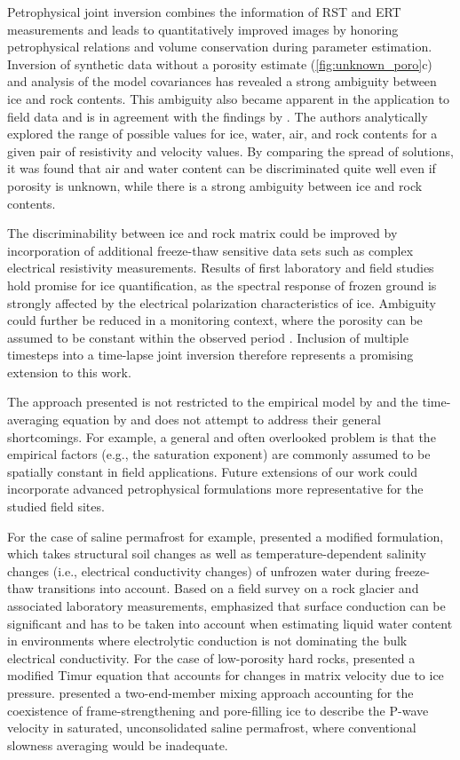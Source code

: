 \documentclass[extra]{gji}
\begin{document}
Petrophysical joint inversion combines the information of RST and ERT measurements and leads to quantitatively improved images by honoring petrophysical relations and volume conservation during parameter estimation.
Inversion of synthetic data without a porosity estimate (\autoref{fig:unknown_poro}c) and analysis of the model covariances has revealed a strong ambiguity between ice and rock contents.
This ambiguity also became apparent in the application to field data and is in agreement with the findings by \cite{Hauck2011}.
The authors analytically explored the range of possible values for ice, water, air, and rock contents for a given pair of resistivity and velocity values.
By comparing the spread of solutions, it was found that air and water content can be discriminated quite well even if porosity is unknown, while there is a strong ambiguity between ice and rock contents.

The discriminability between ice and rock matrix could be improved by incorporation of additional freeze-thaw sensitive data sets such as complex electrical resistivity measurements.
Results of first laboratory \citep{Wu2013, Kemna2014} and field studies \citep{Grimm2015, Mudler2019} hold promise for ice quantification, as the spectral response of frozen ground is strongly affected by the electrical polarization characteristics of ice.
Ambiguity could further be reduced in a monitoring context, where the porosity can be assumed to be constant within the observed period \citep{Hauck2017}.
Inclusion of multiple timesteps into a time-lapse joint inversion therefore represents a promising extension to this work.

The approach presented is not restricted to the empirical model by \cite{Archie1942} and the time-averaging equation by \cite{Timur1968} and does not attempt to address their general shortcomings.
For example, a general and often overlooked problem is that the empirical factors (e.g., the saturation exponent) are commonly assumed to be spatially constant in field applications.
Future extensions of our work could incorporate advanced petrophysical formulations more representative for the studied field sites.

For the case of saline permafrost for example, \cite{Wu2017} presented a modified formulation, which takes structural soil changes as well as temperature-dependent salinity changes (i.e., electrical conductivity changes) of unfrozen water during freeze-thaw transitions into account.
Based on a field survey on a rock glacier and associated laboratory measurements, \cite{Duvillard2018} emphasized that surface conduction can be significant and has to be taken into account when estimating liquid water content in environments where electrolytic conduction is not dominating the bulk electrical conductivity.
For the case of low-porosity hard rocks, \cite{Draebing2012} presented a modified Timur equation that accounts for changes in matrix velocity due to ice pressure.
\cite{Dou2017} presented a two-end-member mixing approach accounting for the coexistence of frame-strengthening and pore-filling ice to describe the P-wave velocity in saturated, unconsolidated saline permafrost, where conventional slowness averaging would be inadequate.
\end{document}
